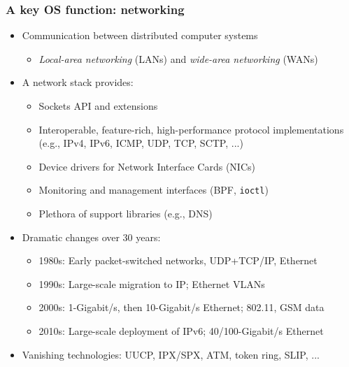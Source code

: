 \begin{frame}
  \frametitle{A key OS function: networking}

  \begin{itemize}
    \item Communication between distributed computer systems
    \begin{itemize}
      \item \textit{Local-area networking} (LANs) and
	\textit{wide-area networking} (WANs)
    \end{itemize}

    \pause
    \medskip

    \item A network stack provides:
    \begin{itemize}
      \item Sockets API and extensions
      \item Interoperable, feature-rich, high-performance protocol implementations
	(e.g., IPv4, IPv6, ICMP, UDP, TCP, SCTP, ...)
      \item Device drivers for Network Interface Cards (NICs)
      \item Monitoring and management interfaces (BPF, \texttt{ioctl})
      \item Plethora of support libraries (e.g., DNS)
    \end{itemize}

    \pause
    \medskip

    \item Dramatic changes over 30 years:
    \begin{itemize}
      \item 1980s: Early packet-switched networks, UDP+TCP/IP, Ethernet
      \item 1990s: Large-scale migration to IP; Ethernet VLANs
      \item 2000s: 1-Gigabit/s, then 10-Gigabit/s Ethernet; 802.11, GSM data
      \item 2010s: Large-scale deployment of IPv6; 40/100-Gigabit/s Ethernet
    \end{itemize}
    \item Vanishing technologies: UUCP, IPX/SPX, ATM, token ring, SLIP, ...
  \end{itemize}
\end{frame}

